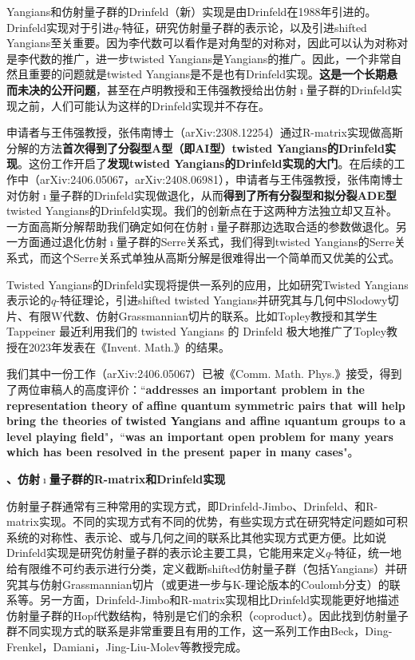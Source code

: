 \documentclass[12pt,UTF8,AutoFakeBold=4,a4paper]{ctexart}
\begin{document}
Yangians和仿射量子群的Drinfeld（新）实现是由Drinfeld在1988年引进的。Drinfeld实现对于引进$q$-特征，研究仿射量子群的表示论，以及引进shifted Yangians至关重要。因为李代数可以看作是对角型的对称对，因此可以认为对称对是李代数的推广，进一步twisted Yangians是Yangians的推广。因此，一个非常自然且重要的问题就是twisted Yangians是不是也有Drinfeld实现。\textbf{这是一个长期悬而未决的公开问题}，甚至在卢明教授和王伟强教授给出仿射$\imath$量子群的Drinfeld实现之前，人们可能认为这样的Drinfeld实现并不存在。

申请者与王伟强教授，张伟南博士（arXiv:2308.12254）通过R-matrix实现做高斯分解的方法\textbf{首次得到了分裂型A型（即AI型）twisted Yangians的Drinfeld实现}。这份工作开启了\textbf{发现twisted Yangians的Drinfeld实现的大门}。在后续的工作中（arXiv:2406.05067，arXiv:2408.06981），申请者与王伟强教授，张伟南博士对仿射$\imath$量子群的Drinfeld实现做退化，从而\textbf{得到了所有分裂型和拟分裂ADE型}twisted Yangians的Drinfeld实现。我们的创新点在于这两种方法独立却又互补。一方面高斯分解帮助我们确定如何在仿射$\imath$量子群那边选取合适的参数做退化。另一方面通过退化仿射$\imath$量子群的Serre关系式，我们得到twisted Yangians的Serre关系式，而这个Serre关系式单独从高斯分解是很难得出一个简单而又优美的公式。

Twisted Yangians的Drinfeld实现将提供一系列的应用，比如研究Twisted Yangians表示论的$q$-特征理论，引进shifted twisted Yangians并研究其与几何中Slodowy切片、有限W代数、仿射Grassmannian切片的联系。比如Topley教授和其学生Tappeiner 最近利用我们的 twisted Yangians 的 Drinfeld 极大地推广了Topley教授在2023年发表在《Invent. Math.》的结果。

我们其中一份工作（arXiv:2406.05067）已被《Comm. Math. Phys.》接受，得到了两位审稿人的高度评价：``\textbf{addresses an important problem in the representation theory of affine
quantum symmetric pairs that will help bring the theories of twisted Yangians and affine ıquantum
groups to a level playing field}"，``\textbf{was an important open problem for many years which has been resolved in the present paper in many cases}"。

\textbf{、仿射$\imath$量子群的R-matrix和Drinfeld实现}

仿射量子群通常有三种常用的实现方式，即Drinfeld-Jimbo、Drinfeld、和R-matrix实现。不同的实现方式有不同的优势，有些实现方式在研究特定问题如可积系统的对称性、表示论、或与几何之间的联系比其他实现方式更方便。比如说Drinfeld实现是研究仿射量子群的表示论主要工具，它能用来定义$q$-特征，统一地给有限维不可约表示进行分类，定义截断shifted仿射量子群（包括Yangians）并研究其与仿射Grassmannian切片（或更进一步与K-理论版本的Coulomb分支）的联系等。另一方面，Drinfeld-Jimbo和R-matrix实现相比Drinfeld实现能更好地描述仿射量子群的Hopf代数结构，特别是它们的余积（coproduct）。因此找到仿射量子群不同实现方式的联系是非常重要且有用的工作，这一系列工作由Beck，Ding-Frenkel，Damiani，Jing-Liu-Molev等教授完成。
\end{document}
